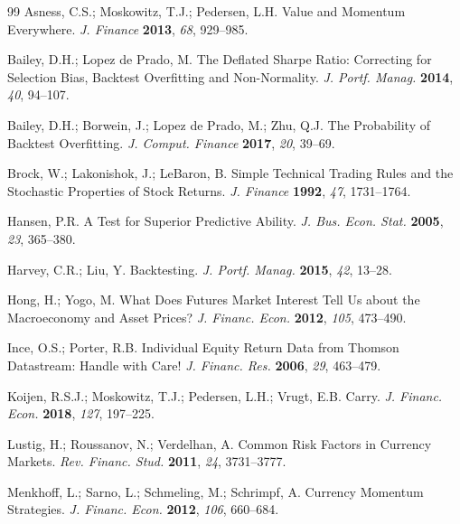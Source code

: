 \documentclass[10pt]{article}
\begin{document}
\begin{thebibliography}{99}
 Asness, C.S.; Moskowitz, T.J.; Pedersen, L.H.
Value and Momentum Everywhere. \emph{J. Finance} \textbf{2013}, \emph{68}, 929--985.

 Bailey, D.H.; Lopez de Prado, M.
The Deflated Sharpe Ratio: Correcting for Selection Bias, Backtest Overfitting and
Non-Normality. \emph{J. Portf. Manag.} \textbf{2014}, \emph{40}, 94--107.

 Bailey, D.H.; Borwein, J.; Lopez de Prado, M.;
Zhu, Q.J. The Probability of Backtest Overfitting. \emph{J. Comput. Finance} \textbf{2017},
\emph{20}, 39--69.

 Brock, W.; Lakonishok, J.; LeBaron, B. Simple
Technical Trading Rules and the Stochastic Properties of Stock Returns. \emph{J. Finance}
\textbf{1992}, \emph{47}, 1731--1764.

 Hansen, P.R. A Test for Superior Predictive Ability.
\emph{J. Bus. Econ. Stat.} \textbf{2005}, \emph{23}, 365--380.

 Harvey, C.R.; Liu, Y. Backtesting.
\emph{J. Portf. Manag.} \textbf{2015}, \emph{42}, 13--28.

 Hong, H.; Yogo, M. What Does Futures Market
Interest Tell Us about the Macroeconomy and Asset Prices? \emph{J. Financ. Econ.}
\textbf{2012}, \emph{105}, 473--490.

 Ince, O.S.; Porter, R.B. Individual Equity
Return Data from Thomson Datastream: Handle with Care! \emph{J. Financ. Res.} \textbf{2006},
\emph{29}, 463--479.

 Koijen, R.S.J.; Moskowitz, T.J.; Pedersen, L.H.;
Vrugt, E.B. Carry. \emph{J. Financ. Econ.} \textbf{2018}, \emph{127}, 197--225.

 Lustig, H.; Roussanov, N.; Verdelhan, A. Common
Risk Factors in Currency Markets. \emph{Rev. Financ. Stud.} \textbf{2011}, \emph{24},
3731--3777.

 Menkhoff, L.; Sarno, L.; Schmeling, M.;
Schrimpf, A. Currency Momentum Strategies. \emph{J. Financ. Econ.} \textbf{2012},
\emph{106}, 660--684.


\end{thebibliography}
\end{document}
